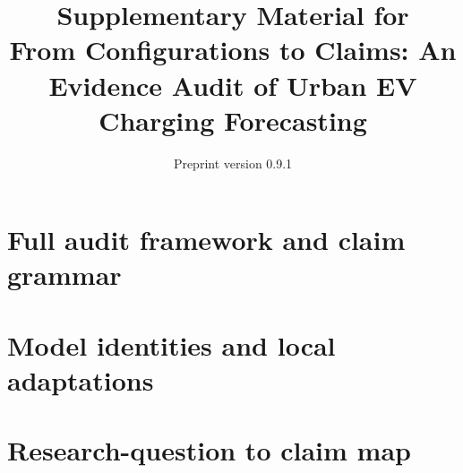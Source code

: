 \documentclass[10pt]{article}
\title{Supplementary Material for\\From Configurations to Claims: An Evidence Audit of Urban EV Charging Forecasting}
\date{Preprint version 0.9.1}
\begin{document}
\maketitle
\provisionalauthorshipnote
\section{Full audit framework and claim grammar}

\section{Model identities and local adaptations}

\FloatBarrier
\section{Research-question to claim map}


\nocite{*}


\end{document}
